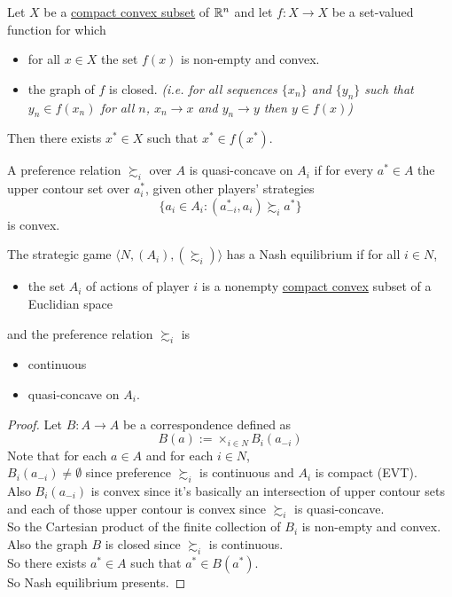 \documentclass[11pt]{article}
\begin{document}
		\begin{lemma}
			Let $X$ be a \ul{compact convex subset} of $\mathbb{R}^n$ and let $f: X \to X$ be a set-valued function for which
			\begin{itemize}
				\item for all $x \in X$ the set $f(x)$ is non-empty and convex.
				\item the graph of $f$ is closed. \emph{(i.e. for all sequences $\{x_n\}$ and $\{y_n\}$ such that $y_n \in f(x_n)$ for all $n$, $x_n \to x$ and $y_n \to y$ then $y \in f(x)$)}
			\end{itemize}
			Then there exists $x^* \in X$ such that $x^* \in f(x^*)$.
		\end{lemma}
		
		\begin{definition}[pg.20]
			A preference relation $\succsim_i$ over $A$ is quasi-concave on $A_i$ if for every $a^* \in A$ the upper contour set over $a^*_i$, given other players' strategies
			\[
				\{a_i \in A_i: (a^*_{-i}, a_i) \succsim_i a^*\}
			\]
			is convex.
		\end{definition}
		
		\begin{proposition}[20.3]
			The strategic game $\langle N, (A_i), (\succsim_i) \rangle$ has a Nash equilibrium if for all $i \in N$,
			\begin{itemize}
				\item the set $A_i$ of actions of player $i$ is a nonempty \ul{compact convex} subset of a Euclidian space
			\end{itemize}
			and the preference relation $\succsim_i$ is
			\begin{itemize}
				\item continuous
				\item quasi-concave on $A_i$.
			\end{itemize}
		\end{proposition}
		
		\begin{proof}
			Let $B: A \to A$ be a correspondence defined as 
			\[
				B(a) := \times_{i \in N} B_i(a_{-i})
			\]
			Note that for each $a \in A$ and for each $i \in N$, \\
			$B_i(a_{-i}) \neq \emptyset$ since preference $\succsim_i$ is continuous and $A_i$ is compact (EVT). \\
			Also $B_i(a_{-i})$ is convex since it's basically an intersection of  upper contour sets and each of those upper contour is convex since $\succsim_i$ is quasi-concave. \\
			So the Cartesian product of the finite collection of $B_i$ is non-empty and convex. \\
			Also the graph $B$ is closed since $\succsim_i$ is continuous. \\
			So there exists $a^* \in A$ such that $a^* \in B(a^*)$. \\
			So Nash equilibrium presents.
		\end{proof}
		
\end{document}
